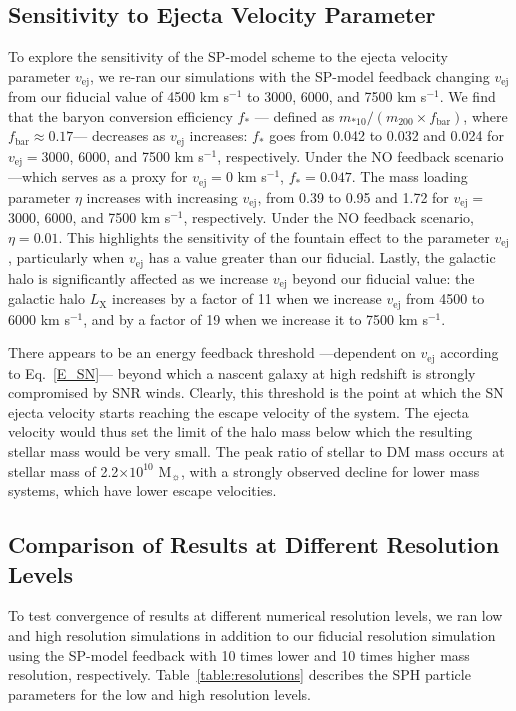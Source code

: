 \documentclass[iop]{emulateapj}
\begin{document}
\subsection{Sensitivity to Ejecta Velocity Parameter}\label{vejecta}
To explore the sensitivity of the SP-model scheme to the ejecta velocity parameter $v_{\mathrm{ej}}$, we re-ran our simulations with the SP-model feedback changing $v_{\mathrm{ej}}$ from our fiducial value of 4500 km s$^{-1}$ to 3000, 6000, and 7500 km s$^{-1}$. We find that the baryon conversion efficiency $f_{*}$ --- defined as $m_{*10}/(m_{200}\times f_{\mathrm{bar}})$, where $f_{\mathrm{bar}}\approx 0.17$--- decreases as $v_{\mathrm{ej}}$ increases: $f_{*}$ goes from 0.042 to 0.032 and 0.024 for $v_{\mathrm{ej}}=3000$, 6000, and 7500 km s$^{-1}$, respectively. Under the NO feedback scenario ---which serves as a proxy for $v_{\mathrm{ej}}=0$ km s$^{-1}$, $f_{*}= 0.047$. The mass loading parameter $\eta$ increases with increasing $v_{\mathrm{ej}}$, from 0.39 to 0.95 and 1.72 for $v_{\mathrm{ej}}=$ 3000, 6000, and 7500 km s$^{-1}$, respectively. Under the NO feedback scenario, $\eta=0.01$. This highlights the sensitivity of the fountain effect to the parameter $v_{\mathrm{ej}}$, particularly when $v_{\mathrm{ej}}$ has a value greater than our fiducial. Lastly, the galactic halo is significantly affected as we increase $v_{\mathrm{ej}}$ beyond our fiducial value: the galactic halo $L_{\mathrm{X}}$ increases by a factor of 11 when we increase $v_{\mathrm{ej}}$ from 4500 to 6000 km s$^{-1}$, and by a factor of 19 when we increase it to 7500 km s$^{-1}$.

There appears to be an energy feedback threshold ---dependent on $v_{\mathrm{ej}}$ according to Eq.~\ref{E_SN}--- beyond which a nascent galaxy at high redshift is strongly compromised by SNR winds. Clearly, this threshold is the point at which the SN ejecta velocity starts reaching the escape velocity of the system. The ejecta velocity would thus set the limit of the halo mass below which the resulting stellar mass would be very small. The peak ratio of stellar to DM mass \citep{Guo10} occurs at stellar mass of 2.2$\times 10^{10}$ M$_{\sun}$, with a strongly observed decline for lower mass systems, which have lower escape velocities.

\subsection{Comparison of Results at Different Resolution Levels}\label{resolutions}
To test convergence of results at different numerical resolution levels, we ran low and high resolution simulations in addition to our fiducial resolution simulation using the SP-model feedback with 10 times lower and 10 times higher mass resolution, respectively. Table~\ref{table:resolutions} describes the SPH particle parameters for the low and high resolution levels.
\end{document}
